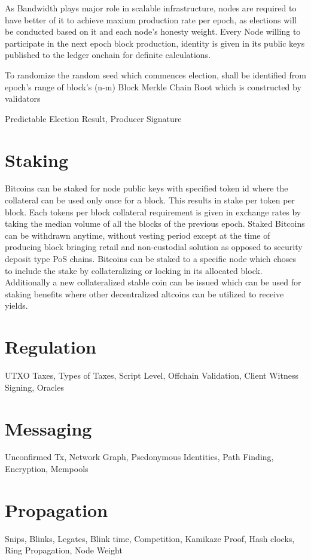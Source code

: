 \documentclass[a4paper,11pt]{article}
\begin{document}
As Bandwidth plays major role in scalable infrastructure, nodes are required to have better of it to achieve maxium production rate per epoch, as elections will be conducted based on it and each node's honesty weight. Every Node willing to participate in the next epoch block production, identity is given in its public keys published to the ledger onchain for definite calculations.

To randomize the random seed which commences election, shall be identified from epoch's range of block's (n-m) Block Merkle Chain Root which is constructed by validators

Predictable Election Result, Producer Signature


\section{Staking}

Bitcoins can be staked for node public keys with specified token id where the collateral can be used only once for a block. This results in stake per token per block. Each tokens per block collateral requirement is given in exchange rates by taking the median volume of all the blocks of the previous epoch. Staked Bitcoins can be withdrawn anytime, without vesting period except at the time of producing block bringing retail and non-custodial solution as opposed to security deposit type PoS chains. Bitcoins can be staked to a specific node which choses to include the stake by collateralizing or locking in its allocated block. Additionally a new collateralized stable coin can be issued which can be used for staking benefits where other decentralized altcoins can be utilized to receive yields. 

\section{Regulation}
UTXO Taxes, Types of Taxes, Script Level, Offchain Validation, Client Witness Signing, Oracles

\section{Messaging}
Unconfirmed Tx, Network Graph, Psedonymous Identities, Path Finding, Encryption, Mempools

\section{Propagation}
Snips, Blinks, Legates, Blink time, Competition, Kamikaze Proof, Hash clocks, Ring Propagation, Node Weight
\end{document}
